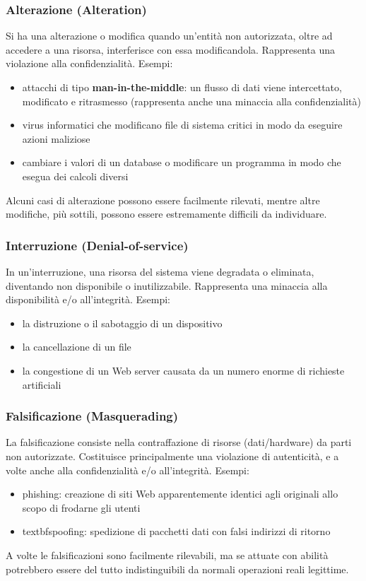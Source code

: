 \subsubsection{Alterazione (Alteration)}
Si ha una alterazione o modifica quando un’entità non autorizzata, oltre ad accedere a una risorsa, interferisce con essa modificandola. Rappresenta una violazione alla confidenzialità. Esempi:
\begin{itemize} 
  \item attacchi di tipo \textbf{man-in-the-middle}: un flusso di dati viene intercettato, modificato e ritrasmesso (rappresenta anche una minaccia alla confidenzialità)
  \item virus informatici che modificano file di sistema critici in modo da eseguire azioni maliziose
  \item cambiare i valori di un database o modificare un programma in modo che esegua dei calcoli diversi
\end{itemize}
Alcuni casi di alterazione possono essere facilmente rilevati, mentre altre modifiche, più sottili, possono essere estremamente difficili da individuare.

\subsubsection{Interruzione (Denial-of-service)}
In un’interruzione, una risorsa del sistema viene degradata o eliminata, diventando non disponibile o inutilizzabile. Rappresenta una minaccia alla disponibilità e/o all'integrità. Esempi:
\begin{itemize} 
  \item la distruzione o il sabotaggio di un dispositivo
  \item la cancellazione di un file
  \item la congestione di un Web server causata da un numero enorme di richieste artificiali
\end{itemize}

\subsubsection{Falsificazione (Masquerading)}
La falsificazione consiste nella contraffazione di risorse (dati/hardware) da parti non autorizzate. Costituisce principalmente una violazione di autenticità, e a volte anche alla confidenzialità e/o all’integrità. Esempi:
\begin{itemize} 
  \item {phishing}: creazione di siti Web apparentemente identici agli originali allo scopo di frodarne gli utenti
  \item textbf{spoofing}: spedizione di pacchetti dati con falsi indirizzi di ritorno
\end{itemize}
A volte le falsificazioni sono facilmente rilevabili, ma se attuate con abilità potrebbero essere del tutto indistinguibili da normali operazioni reali legittime.

